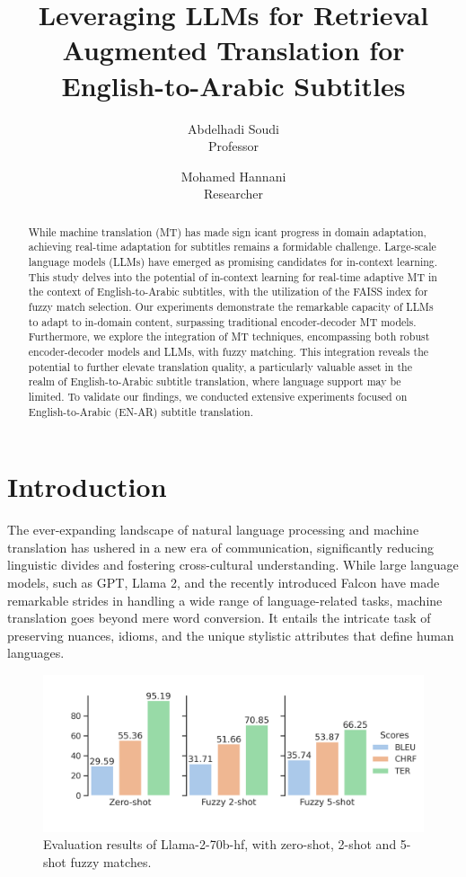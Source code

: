 \documentclass[twocolumn]{article}
\title{Leveraging LLMs for Retrieval Augmented Translation for English-to-Arabic Subtitles}
\author{
	Abdelhadi Soudi \\
	Professor
	\and
	Mohamed Hannani \\
	Researcher
}
\date{}  %
\begin{document}
	

\maketitle

\begin{abstract}
While machine translation (MT) has made sign
icant progress in domain adaptation, achieving real-time adaptation for subtitles remains a formidable challenge. Large-scale language models (LLMs) have emerged as promising candidates for in-context learning. This study delves into the potential of in-context learning for real-time adaptive MT in the context of English-to-Arabic subtitles, with the utilization of the FAISS index for fuzzy match selection. Our experiments demonstrate the remarkable capacity of LLMs to adapt to in-domain content, surpassing traditional encoder-decoder MT models. Furthermore, we explore the integration of MT techniques, encompassing both robust encoder-decoder models and LLMs, with fuzzy matching. This integration reveals the potential to further elevate translation quality, a particularly valuable asset in the realm of English-to-Arabic subtitle translation, where language support may be limited. To validate our findings, we conducted extensive experiments focused on English-to-Arabic (EN-AR) subtitle translation.
	
\end{abstract}
%
\section{Introduction}\label{sec:introduction}

The ever-expanding landscape of natural language processing and machine translation has ushered in a new era of communication, significantly reducing linguistic divides and fostering cross-cultural understanding. While large language models, such as GPT, Llama 2, and the recently introduced Falcon have made remarkable strides in handling a wide range of language-related tasks, machine translation goes beyond mere word conversion. It entails the intricate task of preserving nuances, idioms, and the unique stylistic attributes that define human languages.

\begin{figure}
	\centering
	\includegraphics[width=\linewidth, ]{figs/Llama2_evaluation} %
	\caption{ Evaluation results of Llama-2-70b-hf, with zero-shot, 2-shot and 5-shot fuzzy matches.}
	
	\label{llama_2_evaluation:duck}
\end{figure}
\end{document}

